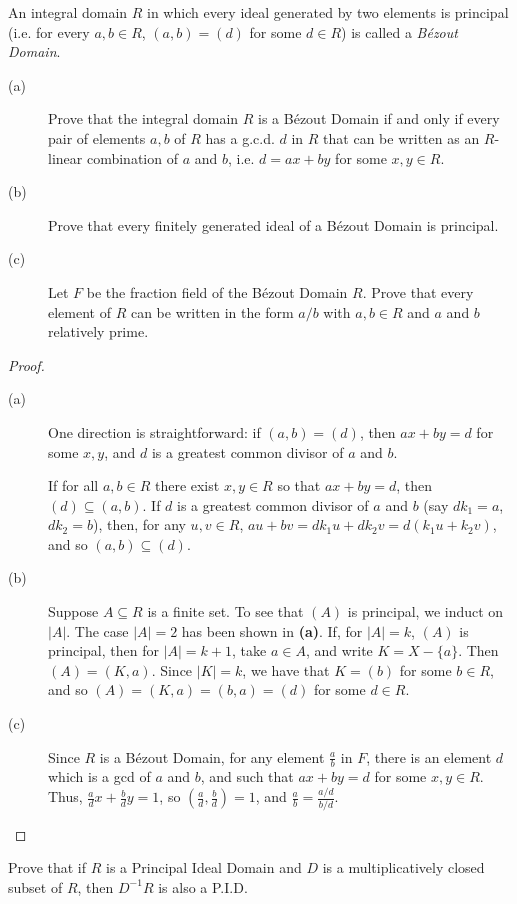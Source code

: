 \documentclass[12pt,leqno]{book}
\numberwithin{equation}{section}
\newcommand{\question}[2] {\vspace{.25in}\noindent\fbox{#1} #2 \vspace{.10in}}
\theoremstyle{definition}
\begin{document}
\question{7}{An integral domain $R$ in which every ideal generated by two elements is principal (i.e. for every $a,b\in R$, $(a,b)=(d)$ for some $d\in R$) is called a \textit{B\'ezout Domain}.}
\begin{description}
 \item [(a)] Prove that the integral domain $R$ is a B\'ezout Domain if and only if every pair of elements $a,b$ of $R$ has a g.c.d. $d$ in $R$ that can be written as an $R$-linear combination of $a$ and $b$, i.e. $d=ax+by$ for some $x,y\in R$.
 \item [(b)] Prove that every finitely generated ideal of a B\'ezout Domain is principal.
 \item [(c)] Let $F$ be the fraction field of the B\'ezout Domain $R$. Prove that every element of $R$ can be written in the form $a/b$ with $a,b\in R$ and $a$ and $b$ relatively prime.
\end{description}

\begin{proof}\indent
 \begin{description}
  \item [(a)] One direction is straightforward: if $(a,b)=(d)$, then $ax+by=d$ for some $x,y$, and $d$ is a greatest common divisor of $a$ and $b$.

If for all $a,b\in R$ there exist $x,y\in R$ so that $ax+by=d$, then $(d)\subseteq(a,b)$. If $d$ is a greatest common divisor of $a$ and $b$ (say $dk_1=a$, $dk_2=b$), then, for any $u,v\in R$, $au+bv=dk_1u+dk_2v=d(k_1u+k_2v)$, and so $(a,b)\subseteq(d)$.
  \item [(b)] Suppose $A\subseteq R$ is a finite set. To see that $(A)$ is principal, we induct on $|A|$. The case $|A|=2$ has been shown in \textbf{(a)}. If, for $|A|=k$, $(A)$ is principal, then for $|A|=k+1$, take $a\in A$, and write $K=X-\{a\}$. Then $(A)=(K,a)$. Since $|K|=k$, we have that $K=(b)$ for some $b\in R$, and so $(A)=(K,a)=(b,a)=(d)$ for some $d\in R$.
  \item [(c)] Since $R$ is a B\'ezout Domain, for any element $\frac{a}{b}$ in $F$, there is an element $d$ which is a gcd of $a$ and $b$, and such that $ax+by=d$ for some $x,y\in R$. Thus, $\frac{a}{d}x+\frac{b}{d}y=1$, so $\left(\frac{a}{d},\frac{b}{d}\right)=1$, and $\frac{a}{b}=\frac{a/d}{b/d}$.\qedhere
 \end{description}
\end{proof}

\question{8}{Prove that if $R$ is a Principal Ideal Domain and $D$ is a multiplicatively closed subset of $R$, then $D^{-1}R$ is also a P.I.D.}
\end{document}
